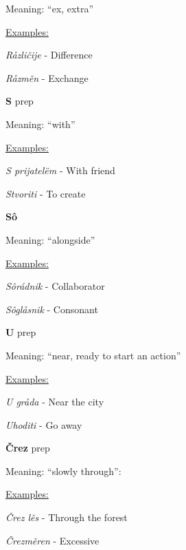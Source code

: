 Meaning: “ex, extra”

\underline{Examples:}

\textit{Råzličije} - Difference

\textit{Råzměn} - Exchange

\textbf{S} \gls{prep}

Meaning: “with”

\underline{Examples:}

\textit{S prijatelëm} - With friend

\textit{Stvoriti} - To create

\textbf{Sô}

Meaning: “alongside”

\underline{Examples:}

\textit{Sôrádnik} - Collaborator

\textit{Sôglåsnik} - Consonant

\textbf{U} \gls{prep}

Meaning: “near, ready to start an action”

\underline{Examples:}

\textit{U gråda} - Near the city

\textit{Uhoditi} - Go away

\textbf{Črez} \gls{prep}

Meaning: “slowly through”:

\underline{Examples:}

\textit{Črez lěs} - Through the forest

\textit{Črezměren} - Excessive
